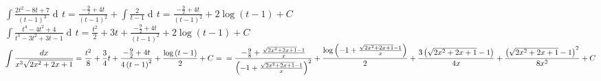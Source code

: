 \documentclass{article}
\newcommand{\ds}{\displaystyle}
\newcommand{\D}[1]{\mathop{d\!}{#1}}
\newcommand{\dx}{\D{x}}
\newcommand{\dt}{\D{t}}
\renewcommand{\L}{\left}
\newcommand{\R}{\right}
\newcommand{\F}{\frac}
\renewcommand{\C}{+C}
\begin{document}
  $\ds \int \F{2t^2-8t+7}{\L(t - 1\R)^3} \dt = \F{-\F{9}{2}+4t}{\L(t - 1\R)^2} + \int \F{2}{t - 1} \dt
  = \F{-\F{9}{2}+4t}{\L(t - 1\R)^2} + 2\log\L(t - 1\R) \C $ \\
  $\ds \int \F{ t^4 - 4t^2 + 4 }{ t^3 - 3t^2 + 3t - 1 } \dt = \F{t^2}{2} + 3t + \F{-\F{9}{2}+4t}{\L(t - 1\R)^2} + 2\log\L(t - 1\R) \C $ \\
  $\ds \int \F{\dx}{x^3\sqrt{2x^2+2x+1}} = \F{t^2}{8} + \F{3}{4}t + \F{-\F{9}{2}+4t}{4\L(t - 1\R)^2} + \F{\log\L(t - 1\R)}{2} \C
  =\\= \F{- \F{9}{8} + \F{\sqrt{2 x^{2} + 2 x + 1} - 1}{x}}{\L(-1 + \F{\sqrt{2 x^{2} + 2 x + 1} - 1}{x}\R)^{2}} + \F{\log{\L(-1 + \F{\sqrt{2 x^{2} + 2 x + 1} - 1}{x} \R)}}{2} + \F{3 \L(\sqrt{2 x^{2} + 2 x + 1} - 1\R)}{4 x} + \F{\L(\sqrt{2 x^{2} + 2 x + 1} - 1\R)^{2}}{8 x^{2}} \C
  $
\end{document}
